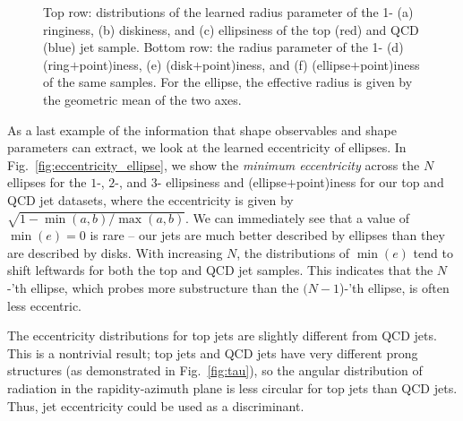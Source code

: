 \documentclass[letterpaper,11pt]{article}
\DeclareRobustCommand{\Fig}[1]{Fig.~\ref{fig:#1}}
\begin{document}
\begin{figure*}[tp]
    \centering
    \vspace{1pt}
    \caption{
        Top row: distributions of the learned radius parameter of the 1- (a) ringiness, (b) diskiness, and (c) ellipsiness of the top (red) and QCD (blue) jet sample. Bottom row: the radius parameter of the 1- (d) (ring$+$point)iness, (e) (disk$+$point)iness, and (f) (ellipse$+$point)iness of the same samples. For the ellipse, the effective radius is given by the geometric mean of the two axes. 
        }
    \label{fig:radius}
\end{figure*}

 As a last example of the information that shape observables and shape parameters can extract, we look at the learned eccentricity of ellipses. In \Fig{eccentricity_ellipse}, we show the \emph{minimum eccentricity} across the $N$ ellipses for the $1$-, $2$-, and $3$- ellipsiness and (ellipse$+$point)iness for our top and QCD jet datasets, where the eccentricity is given by $\sqrt{1 - \min(a,b)/\max(a,b)}$. We can immediately see that a value of $\min(e) = 0$ is rare -- our jets are much better described by ellipses than they are described by disks. With increasing $N$, the distributions of $\min(e)$ tend to shift leftwards for both the top and QCD jet samples. This indicates that the $N$-'th ellipse, which probes more substructure than the $(N-1$)-'th ellipse, is often less eccentric. 
 
 
 The eccentricity distributions for top jets are slightly different from QCD jets. This is a nontrivial result; top jets and QCD jets have very different prong structures (as demonstrated in \Fig{tau}), so the angular distribution of radiation in the rapidity-azimuth plane is less circular for top jets than QCD jets. Thus, jet eccentricity could be used as a discriminant.
 
\end{document}
